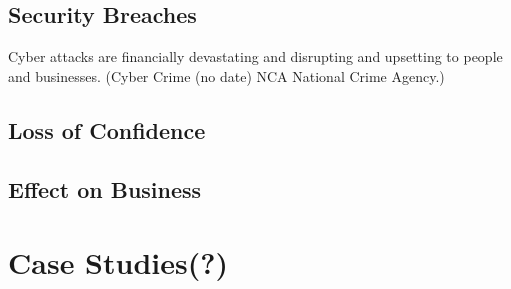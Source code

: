     \subsection{Security Breaches}
        Cyber attacks are financially devastating and disrupting and upsetting to people and businesses. (Cyber Crime (no date) NCA National Crime Agency.)
    
    \subsection{Loss of Confidence}

    \subsection{Effect on Business}


\section{Case Studies(?)}
